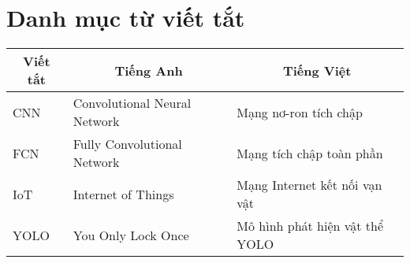 

\renewcommand{\listtablename}{ DANH MỤC TỪ VIẾT TẮT}
\cleardoublepage
{}
{}
\chapter*{Danh mục từ viết tắt}
\begin{longtable}[c]{|l|l|l|}
	\hline
	\multicolumn{1}{|c|}{\textbf{Viết tắt}} & \multicolumn{1}{c|}{\textbf{Tiếng Anh}} & \multicolumn{1}{c|}{\textbf{Tiếng Việt}} \\ \hline
	\endhead
	CNN & Convolutional Neural Network & Mạng nơ-ron tích chập \\ \hline
	FCN & Fully Convolutional Network & Mạng tích chập toàn phần \\ \hline
	IoT & Internet of Things & Mạng Internet kết nối vạn vật \\ \hline
	YOLO & You Only Lock Once & Mô hình phát hiện vật thể YOLO \\ \hline
\end{longtable}